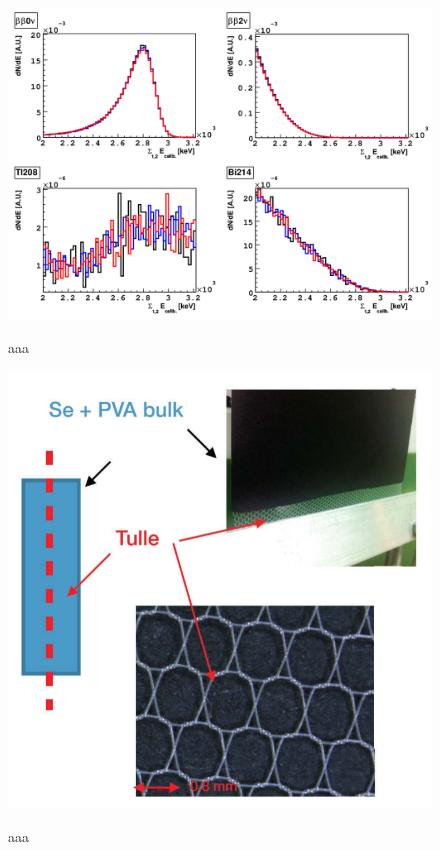 \documentclass[main.tex]{subfiles}
\begin{document}
\begin{figure}[h!]
\centering
\includegraphics[scale=0.3]{pictures/Chap4/SpectrumThickness.png}
\label{SpectrumThickness.png}
\caption{aaa}
\end{figure}


\begin{figure}[h!]
\centering
\includegraphics[scale=0.3]{pictures/Chap4/TulleDesign.png}
\label{TulleDesign.png}
\caption{aaa}
\end{figure}
\end{document}
